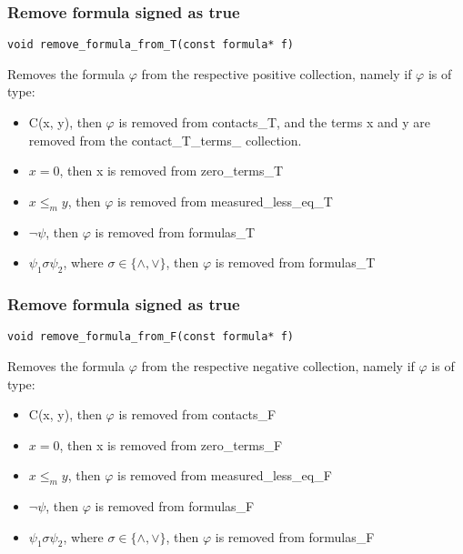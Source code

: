 \documentclass{article}
\begin{document}
			\subsubsection*{Remove formula signed as true}
				\begin{lstlisting}
void remove_formula_from_T(const formula* f)
				\end{lstlisting}
				Removes the formula $\varphi$ from the respective positive collection, namely
				if $\varphi$ is of type:
				\begin{itemize}
					\item C(x, y), then $\varphi$ is removed from contacts\_T, and the terms x and y are removed from the contact\_T\_terms\_ collection.
					\item $x = 0$, then x is removed from zero\_terms\_T
					\item $x \le_m y$, then $\varphi$ is removed from measured\_less\_eq\_T
					\item $\neg \psi$, then $\varphi$ is removed from formulas\_T
					\item $\psi_1 \sigma \psi_2$, where $\sigma \in \{\wedge, \vee\}$, then $\varphi$ is removed from formulas\_T
				\end{itemize}
			\subsubsection*{Remove formula signed as true}
				\begin{lstlisting}
void remove_formula_from_F(const formula* f)
				\end{lstlisting}
				Removes the formula $\varphi$ from the respective negative collection, namely
				if $\varphi$ is of type:
				\begin{itemize}
					\item C(x, y), then $\varphi$ is removed from contacts\_F
					\item $x = 0$, then x is removed from zero\_terms\_F
					\item $x \le_m y$, then $\varphi$ is removed from measured\_less\_eq\_F
					\item $\neg \psi$, then $\varphi$ is removed from formulas\_F
					\item $\psi_1 \sigma \psi_2$, where $\sigma \in \{\wedge, \vee\}$, then $\varphi$ is removed from formulas\_F
				\end{itemize}
\end{document}
